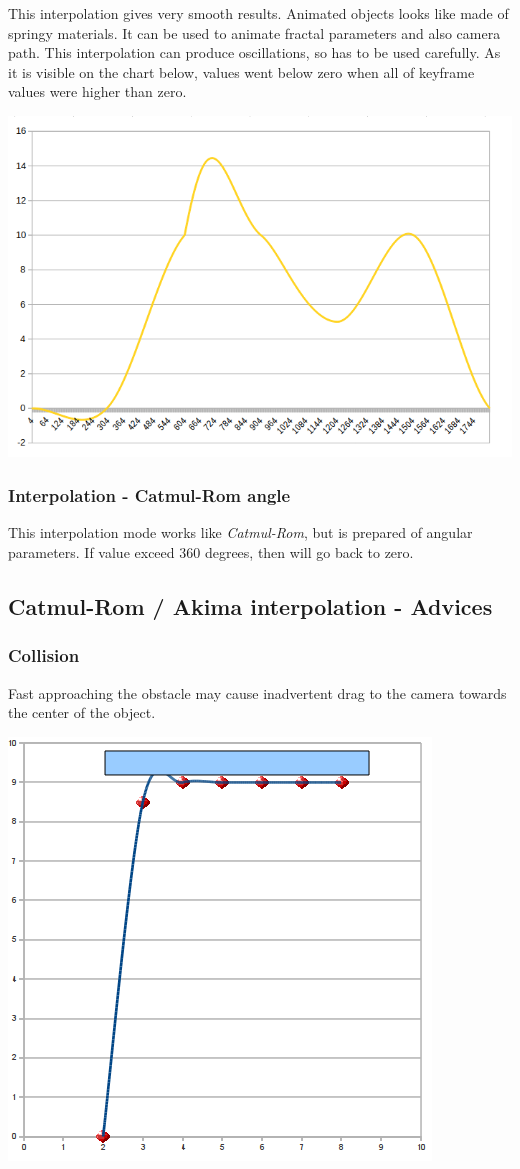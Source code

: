 This interpolation gives very smooth results. Animated objects looks like made
of springy materials. It can be used to animate fractal parameters and also
camera path. This interpolation can produce oscillations, so has to be used
carefully. As it is visible on the chart below, values went below zero when all
of keyframe values were higher than zero.

\includegraphics[width=0.5\linewidth]{img/manual/media/interpolation_catmulrom.png}

\subsubsection{Interpolation - Catmul-Rom
	angle}\label{interpolation-catmul-rom-angle}

This interpolation mode works like \emph{Catmul-Rom}, but is prepared of angular
parameters. If value exceed 360 degrees, then will go back to zero.

\subsection{Catmul-Rom / Akima interpolation -
	Advices}\label{catmul-rom-akima-interpolation---advices}

\subsubsection{Collision}\label{collision}

Fast approaching the obstacle may cause inadvertent drag to the camera towards
the center of the object. 

\includegraphics[width=0.4\linewidth]{img/manual/media/catmull-rom_collision.png}


